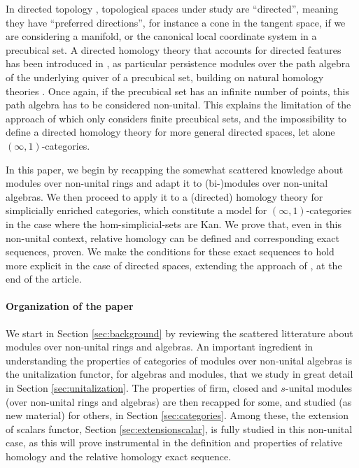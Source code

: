 \documentclass[a4paper,fleqn]{cas-sc}
\begin{document}
In directed topology \cite{thebook,grandisbook}, topological spaces under study are ``directed'', meaning they have ``preferred directions'', for instance a cone in the tangent space, if we are considering a manifold, or the canonical local coordinate system in a precubical set. A directed homology theory that accounts for directed features has been introduced in \cite{eric}, as particular persistence modules over the path algebra of the underlying quiver of a precubical set, building on natural homology theories \cite{Dubut}. Once again, if the precubical set has an infinite number of points, this path algebra has to be considered non-unital. This explains the limitation of the approach of \cite{eric} which only considers finite precubical sets, and the impossibility to define a directed homology theory for more general directed spaces, let alone $(\infty,1)$-categories. 

In this paper, we begin by recapping the somewhat scattered knowledge about modules over non-unital rings and adapt it to (bi-)modules over non-unital algebras. We then proceed to apply it to a (directed) homology theory for simplicially enriched categories, which constitute a model for $(\infty,1)$-categories in the case where the hom-simplicial-sets are Kan. 
We prove that, even in this non-unital context, relative homology can be defined and corresponding exact sequences, proven. We make the conditions for these exact sequences to hold more explicit in the case of directed spaces, extending the approach of \cite{eric}, at the end of the article. 

\paragraph{Organization of the paper}

We start in Section \ref{sec:background} by reviewing the scattered litterature about modules over non-unital rings and algebras. An important ingredient in understanding the properties of categories of modules over non-unital algebras is the unitalization functor, for algebras and modules, that we study in great detail in Section \ref{sec:unitalization}. 
The properties of firm, closed and $s$-unital modules (over non-unital rings and algebras) are then recapped for some, and studied (as new material) for others, in Section \ref{sec:categories}. Among these, the extension of scalars functor, Section \ref{sec:extensionscalar}, is fully studied in this non-unital case, as this will prove instrumental in the definition and properties of relative homology and the relative homology exact sequence. 
\end{document}

